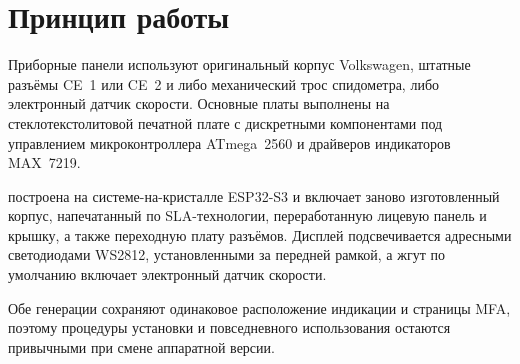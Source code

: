 \chapter{Принцип работы}\label{ch:operating-principle-ru}

Приборные панели \ReplicaGenOne{} используют оригинальный корпус Volkswagen, штатные разъёмы CE~1 или CE~2 и либо механический трос спидометра, либо электронный датчик скорости.
Основные платы \ReplicaGenOneShort{} выполнены на стеклотекстолитовой печатной плате с дискретными компонентами под управлением микроконтроллера ATmega~2560 и драйверов индикаторов MAX~7219.

\ReplicaNextLong{} построена на системе-на-кристалле ESP32-S3 и включает заново изготовленный корпус, напечатанный по SLA-технологии, переработанную лицевую панель и крышку, а также переходную плату разъёмов.
Дисплей \ReplicaNextShort{} подсвечивается адресными светодиодами WS2812, установленными за передней рамкой, а жгут по умолчанию включает электронный датчик скорости.

Обе генерации сохраняют одинаковое расположение индикации и страницы MFA, поэтому процедуры установки и повседневного использования остаются привычными при смене аппаратной версии.
